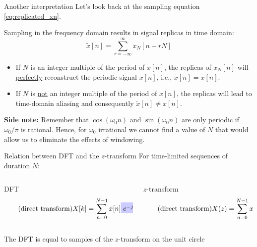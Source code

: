 \documentclass[10pt]{beamer}
\begin{document}
%
\begin{frame}{Another interpretation}
	Let's look back at the sampling equation \eqref{eq:replicated_xn}. 

	Sampling in the frequency domain results in signal replicas in time domain:
	\begin{equation*}
	\tilde{x}[n] = \sum_{r=-\infty}^\infty x_N[n-rN]
	\end{equation*}
	
	\begin{itemize}
		\item If $N$ is an integer multiple of the period of $x[n]$, the replicas of $x_N[n]$ will \underline{perfectly} reconstruct the periodic signal $x[n]$, i.e., $\tilde{x}[n] = x[n]$.
		\item If $N$ is \underline{not} an integer multiple of the period of $x[n]$, the replicas will lead to time-domain aliasing and consequently $\tilde{x}[n]\neq x[n]$.
	\end{itemize}
	
	\vspace{0.25cm}	
	\textbf{Side note:} Remember that $\cos(\omega_0n)$ and $\sin(\omega_0n)$ are only periodic if $\omega_0/\pi$ is rational. Hence, for $\omega_0$ irrational we cannot find a value of $N$ that would allow us to eliminate the effects of windowing.
\end{frame}


%
\begin{frame}{Relation between DFT and the $z$-transform}
For time-limited sequences of duration $N$:
\vspace{-0.3cm}
\begin{columns}[t]
\begin{column}{0.5\textwidth}
	\begin{block}{DFT}
		\vspace{-0.3cm}
		\begin{equation} \tag{direct transform}
		X[k] = \sum_{n=0}^{N-1} x[n]\tikz[baseline]{
			\node[fill=blue!20,anchor=base] (t1) {$e^{-j(2\pi/N)kn}$};
		}
		\end{equation}
	\end{block}
\end{column}
\begin{column}{0.5\textwidth}
	\begin{block}{$z$-transform}
		\vspace{-0.3cm}
		\begin{equation} \tag{direct transform}
		X(z) = \sum_{n=0}^{N-1} x[n]\tikz[baseline]{
			\node[fill=blue!20,anchor=base] (t1) {$z^{-n}$};
		}
		\end{equation}
	\end{block}
\end{column}
\end{columns}
\vspace{0.5cm}
The DFT is equal to samples of the $z$-transform on the unit circle
\begin{figure}
\centering
\resizebox{0.5\linewidth}{!}{}
\label{fig:sampled_unit_circle}
\end{figure}
\end{frame}
\end{document}
